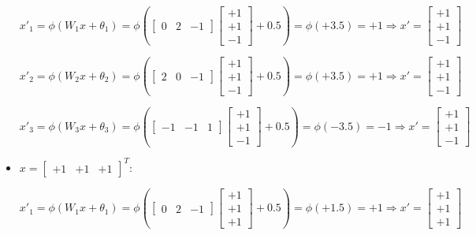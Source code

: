 \documentclass[letterpaper,headings=standardclasses]{scrartcl}
\begin{document}
\begin{itemize}
$$ x'_{1} = \phi(W_1 x + \theta_1) = \phi \left( \left[ \begin{matrix} 0 & 2 & -1 \end{matrix} \right] \left[ \begin{matrix} +1 \\ +1 \\ -1 \end{matrix} \right] + 0.5 \right) = \phi \left( +3.5 \right) = +1 \Rightarrow x' = \left[ \begin{matrix} +1 \\ +1 \\ -1 \end{matrix} \right] $$

$$ x'_{2} = \phi(W_2 x + \theta_2) = \phi \left( \left[ \begin{matrix} 2 & 0 & -1 \end{matrix} \right] \left[ \begin{matrix} +1 \\ +1 \\ -1 \end{matrix} \right] + 0.5 \right) = \phi \left( +3.5 \right) = +1 \Rightarrow x' = \left[ \begin{matrix} +1 \\ +1 \\ -1 \end{matrix} \right] $$

$$ x'_{3} = \phi(W_3 x + \theta_3) = \phi \left( \left[ \begin{matrix} -1 & -1 & 1 \end{matrix} \right] \left[ \begin{matrix} +1 \\ +1 \\ -1 \end{matrix} \right] + 0.5 \right) = \phi \left( -3.5 \right) = -1 \Rightarrow x' = \left[ \begin{matrix} +1 \\ +1 \\ -1 \end{matrix} \right] $$

\item $x = [\begin{matrix} +1 & +1 & +1 \end{matrix}]^T$:

$$ x'_{1} = \phi(W_1 x + \theta_1) = \phi \left( \left[ \begin{matrix} 0 & 2 & -1 \end{matrix} \right] \left[ \begin{matrix} +1 \\ +1 \\ +1 \end{matrix} \right] + 0.5 \right) = \phi \left( +1.5 \right) = +1 \Rightarrow x' = \left[ \begin{matrix} +1 \\ +1 \\ +1 \end{matrix} \right] $$


\end{itemize}
\end{document}
